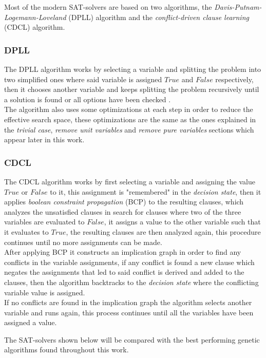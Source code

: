 Most of the modern SAT-solvers are based on two algorithms, the \textit{Davis-Putnam-Logemann-Loveland} (DPLL) algorithm and the \textit{conflict-driven clause learning} (CDCL) algorithm.

\subsubsection{DPLL}
The DPLL algorithm works by selecting a variable and splitting the problem into two simplified ones where said variable is assigned $True$ and $False$ respectively, then it chooses another variable and keeps splitting the problem recursively until a solution is found or all options have been checked \parencite{Davis1962}.
\\The algorithm also uses some optimizations at each step in order to reduce the effective search space, these optimizations are the same as the ones explained in the \textit{trivial case}, \textit{remove unit variables} and \textit{remove pure variables} sections which appear later in this work.

\subsubsection{CDCL}

The CDCL algorithm works by first selecting a variable and assigning the value $True$ or $False$ to it, this assignment is "remembered" in the \textit{decision state}, then it applies \textit{boolean constraint propagation} (BCP) to the resulting clauses, which analyzes the unsatisfied clauses in search for clauses where two of the three variables are evaluated to $False$, it assigns a value to the other variable such that it evaluates to $True$, the resulting clauses are then analyzed again, this procedure continues until no more assignments can be made.
\\After applying BCP it constructs an implication graph in order to find any conflicts in the variable assignments, if any conflict is found a new clause which negates the assignments that led to said conflict is derived and added to the clauses, then the algorithm backtracks to the \textit{decision state} where the conflicting variable value is assigned.
\\If no conflicts are found in the implication graph the algorithm selects another variable and runs again, this process continues until all the variables have been assigned a value.

\bigbreak
The SAT-solvers shown below will be compared with the best performing genetic algorithms found throughout this work.

